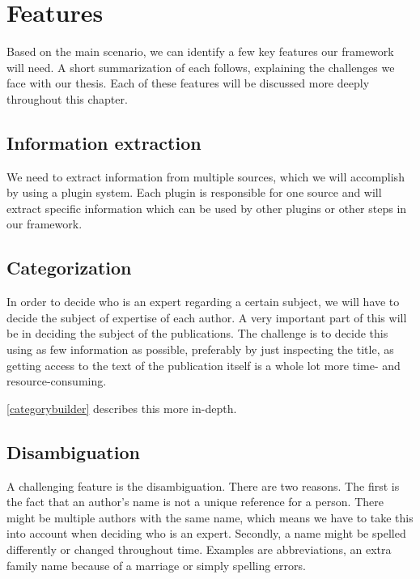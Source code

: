
\section{Features}

Based on the main scenario, we can identify a few key features our framework will need. A short summarization of each follows, explaining the challenges we face with our thesis. Each of these features will be discussed more deeply throughout this chapter.


\subsection{Information extraction}

We need to extract information from multiple sources, which we will accomplish by using a plugin system. Each plugin is responsible for one source and will extract specific information which can be used by other plugins or other steps in our framework.

\subsection{Categorization}

In order to decide who is an expert regarding a certain subject, we will have to decide the subject of expertise of each author. A very important part of this will be in deciding the subject of the publications. The challenge is to decide this using as few information as possible, preferably by just inspecting the title, as getting access to the text of the publication itself is a whole lot more time- and resource-consuming.

\ref{categorybuilder} describes this more in-depth.

\subsection{Disambiguation}

A challenging feature is the disambiguation. There are two reasons. The first is the fact that an author's name is not a unique reference for a person. There might be multiple authors with the same name, which means we have to take this into account when deciding who is an expert. Secondly, a name might be spelled differently or changed throughout time. Examples are abbreviations, an extra family name because of a marriage or simply spelling errors.


